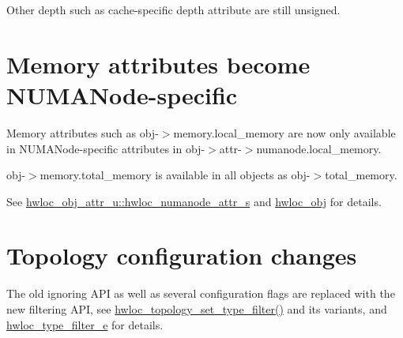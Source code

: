 Other depth such as cache-\/specific depth attribute are still unsigned.

 \hypertarget{a00395_upgrade_to_api_2x_memory_attrs}{}\section{Memory attributes become N\+U\+M\+A\+Node-\/specific}\label{a00395_upgrade_to_api_2x_memory_attrs}
Memory attributes such as {\ttfamily obj-\/$>$memory.\+local\+\_\+memory} are now only available in N\+U\+M\+A\+Node-\/specific attributes in {\ttfamily obj-\/$>$attr-\/$>$numanode.\+local\+\_\+memory}.

{\ttfamily obj-\/$>$memory.\+total\+\_\+memory} is available in all objects as {\ttfamily obj-\/$>$total\+\_\+memory}.

See \hyperlink{a00246}{hwloc\+\_\+obj\+\_\+attr\+\_\+u\+::hwloc\+\_\+numanode\+\_\+attr\+\_\+s} and \hyperlink{a00238}{hwloc\+\_\+obj} for details.

 \hypertarget{a00395_upgrade_to_api_2x_config}{}\section{Topology configuration changes}\label{a00395_upgrade_to_api_2x_config}
The old ignoring A\+PI as well as several configuration flags are replaced with the new filtering A\+PI, see \hyperlink{a00193_gad894e70f15f8d4aada7be8d1aba38b7e}{hwloc\+\_\+topology\+\_\+set\+\_\+type\+\_\+filter()} and its variants, and \hyperlink{a00193_ga9a5a1f0140cd1952544477833733195b}{hwloc\+\_\+type\+\_\+filter\+\_\+e} for details.



